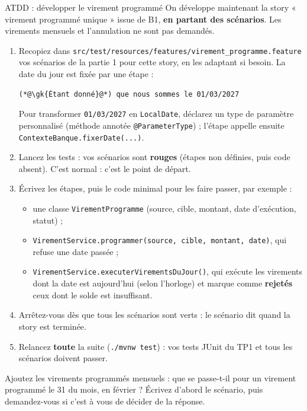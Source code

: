 \documentclass[11pt]{article}
\newcommand{\gk}[1]{\textcolor{qacodekwl}{\textbf{#1}}}
\begin{document}
\begin{exobox}{ATDD : développer le virement programmé}
On développe maintenant la story « virement programmé unique » issue de B1, \textbf{en partant des scénarios}. Les virements mensuels et l'annulation ne sont pas demandés.
\begin{enumerate}[leftmargin=1.4em]
  \item Recopiez dans \texttt{src/test/resources/features/virement\_programme.feature} vos scénarios de la partie 1 pour cette story, en les adaptant si besoin. La date du jour est fixée par une étape :
\begin{lstlisting}[language=Gherkin]
    (*@\gk{Étant donné}@*) que nous sommes le 01/03/2027
\end{lstlisting}
  Pour transformer \texttt{01/03/2027} en \texttt{LocalDate}, déclarez un type de paramètre personnalisé (méthode annotée \texttt{@ParameterType}) ; l'étape appelle ensuite \texttt{ContexteBanque.fixerDate(...)}.
  \item Lancez les tests : vos scénarios sont \textbf{rouges} (étapes non définies, puis code absent). C'est normal : c'est le point de départ.
  \item Écrivez les étapes, puis le code minimal pour les faire passer, par exemple :
  \begin{itemize}[itemsep=0pt]
    \item une classe \texttt{VirementProgramme} (source, cible, montant, date d'exécution, statut) ;
    \item \texttt{VirementService.programmer(source, cible, montant, date)}, qui refuse une date passée ;
    \item \texttt{VirementService.executerVirementsDuJour()}, qui exécute les virements dont la date est aujourd'hui (selon l'horloge) et marque comme \textbf{rejetés} ceux dont le solde est insuffisant.
  \end{itemize}
  \item Arrêtez-vous dès que tous les scénarios sont verts : le scénario dit quand la story est terminée.
  \item Relancez \textbf{toute} la suite (\texttt{./mvnw test}) : vos tests JUnit du TP1 et tous les scénarios doivent passer.
\end{enumerate}
\end{exobox}

\begin{infobox}
Ajoutez les virements programmés mensuels : que se passe-t-il pour un virement programmé le 31 du mois, en février ? Écrivez d'abord le scénario, puis demandez-vous si c'est à vous de décider de la réponse.
\end{infobox}
\end{document}
